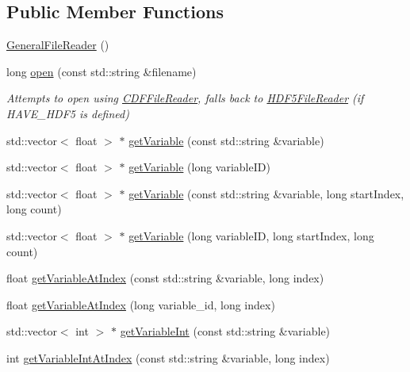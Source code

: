 \subsection*{Public Member Functions}
\begin{DoxyCompactItemize}
\item 
\hyperlink{classccmc_1_1_general_file_reader_a617946630c27444852aba7e4b63a7083}{General\-File\-Reader} ()
\item 
long \hyperlink{classccmc_1_1_general_file_reader_a4996a8e305a2e1f9f25228d127bb55bf}{open} (const std\-::string \&filename)
\begin{DoxyCompactList}\small\item\em Attempts to open using \hyperlink{classccmc_1_1_c_d_f_file_reader}{C\-D\-F\-File\-Reader}, falls back to \hyperlink{classccmc_1_1_h_d_f5_file_reader}{H\-D\-F5\-File\-Reader} (if H\-A\-V\-E\-\_\-\-H\-D\-F5 is defined) \end{DoxyCompactList}\item 
std\-::vector$<$ float $>$ $\ast$ \hyperlink{classccmc_1_1_general_file_reader_a15db2e13a3cc71bf0fea4ea46725c22a}{get\-Variable} (const std\-::string \&variable)
\item 
std\-::vector$<$ float $>$ $\ast$ \hyperlink{classccmc_1_1_general_file_reader_af665752bc662aa649922a4f30a402237}{get\-Variable} (long variable\-I\-D)
\item 
std\-::vector$<$ float $>$ $\ast$ \hyperlink{classccmc_1_1_general_file_reader_aeff376239d655e3783354189f4f3d66d}{get\-Variable} (const std\-::string \&variable, long start\-Index, long count)
\item 
std\-::vector$<$ float $>$ $\ast$ \hyperlink{classccmc_1_1_general_file_reader_a28a9e659f4708f24cd3208e1e5c72e7c}{get\-Variable} (long variable\-I\-D, long start\-Index, long count)
\item 
float \hyperlink{classccmc_1_1_general_file_reader_a61068a06575870558c7939f66b562848}{get\-Variable\-At\-Index} (const std\-::string \&variable, long index)
\item 
float \hyperlink{classccmc_1_1_general_file_reader_a19fa7bdf7fa3398daa7760bd045ae462}{get\-Variable\-At\-Index} (long variable\-\_\-id, long index)
\item 
std\-::vector$<$ int $>$ $\ast$ \hyperlink{classccmc_1_1_general_file_reader_a9715fb0dcb4c322dcff51749ba1dcf70}{get\-Variable\-Int} (const std\-::string \&variable)
\item 
int \hyperlink{classccmc_1_1_general_file_reader_a14473611318b2de4f43a3a5f52ad5bf1}{get\-Variable\-Int\-At\-Index} (const std\-::string \&variable, long index)

\end{DoxyCompactItemize}
